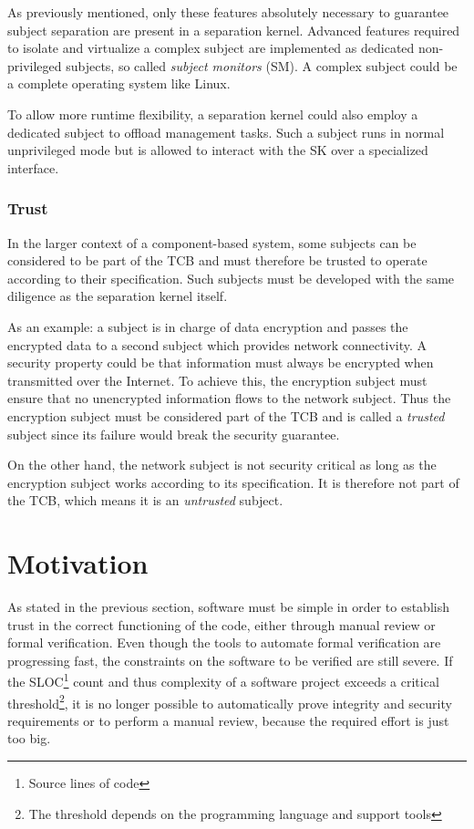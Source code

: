 As previously mentioned, only these features absolutely necessary to guarantee
subject separation are present in a separation kernel. Advanced features
required to isolate and virtualize a complex subject are implemented as
dedicated non-privileged subjects, so called \emph{subject monitors}
(SM). A complex subject could be a complete operating system like
Linux.

To allow more runtime flexibility, a separation kernel could also employ a
dedicated subject to offload management tasks. Such a subject runs in normal
unprivileged mode but is allowed to interact with the SK over a specialized
interface.

\subsubsection{Trust}
In the larger context of a component-based system, some subjects can be
considered to be part of the TCB and must therefore be trusted to operate
according to their specification. Such subjects must be developed with the same
diligence as the separation kernel itself.

As an example: a subject is in charge of data encryption and passes the
encrypted data to a second subject which provides network connectivity. A
security property could be that information must always be encrypted when
transmitted over the Internet. To achieve this, the encryption subject must
ensure that no unencrypted information flows to the network subject. Thus the
encryption subject must be considered part of the TCB and is called a
\emph{trusted} subject since its failure would break the security guarantee.

On the other hand, the network subject is not security critical as long as the
encryption subject works according to its specification. It is therefore not
part of the TCB, which means it is an \emph{untrusted} subject.

\section{Motivation}
As stated in the previous section, software must be simple in order to
establish trust in the correct functioning of the code, either through manual
review or formal verification. Even though the tools to automate formal
verification are progressing fast, the constraints on the software to be
verified are still severe. If the SLOC\footnote{Source lines of
code} count and thus complexity of a software project exceeds a
critical threshold\footnote{The threshold depends on the programming language
and support tools}, it is no longer possible to automatically prove integrity
and security requirements or to perform a manual review, because the required
effort is just too big.

